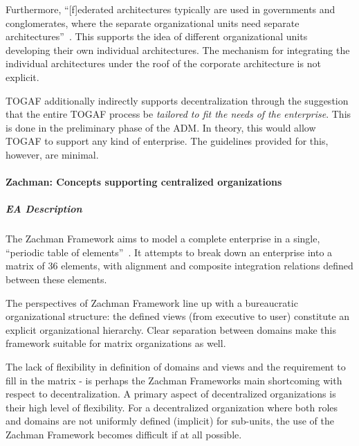 Furthermore, ``[f]ederated architectures typically are used in governments and conglomerates, where the separate organizational units need separate architectures''~\cite[Ch. 40.3]{togaf9.1}. This supports the idea of different organizational units developing their own individual architectures. The mechanism for integrating the individual architectures under the roof of the corporate architecture is not explicit. 


TOGAF additionally indirectly supports decentralization through the suggestion that the entire TOGAF process be\textit{ tailored to fit the needs of the enterprise}. This is done in the preliminary phase of the ADM. In theory, this would allow TOGAF to support any kind of enterprise. The guidelines provided for this, however, are minimal. 

\paragraph*{Zachman: Concepts supporting centralized organizations}
\subparagraph*{EA Description}
The Zachman Framework aims to model a complete enterprise in a single, ``periodic table of elements''~\cite{Bente2012}. It attempts to break down an enterprise into a matrix of 36 elements, with alignment and composite integration relations defined between these elements. 

The perspectives of Zachman Framework line up with a bureaucratic organizational structure: the defined views (from executive to user) constitute an explicit organizational hierarchy. Clear separation between domains make this framework suitable for matrix organizations as well. 

The lack of flexibility in definition of domains and views and the requirement to fill in the matrix - is perhaps the Zachman Frameworks main shortcoming with respect to decentralization. A primary aspect of decentralized organizations is their high level of flexibility. For a decentralized organization where both roles and domains are not uniformly defined (implicit) for sub-units, the use of the Zachman Framework becomes difficult if at all possible.


